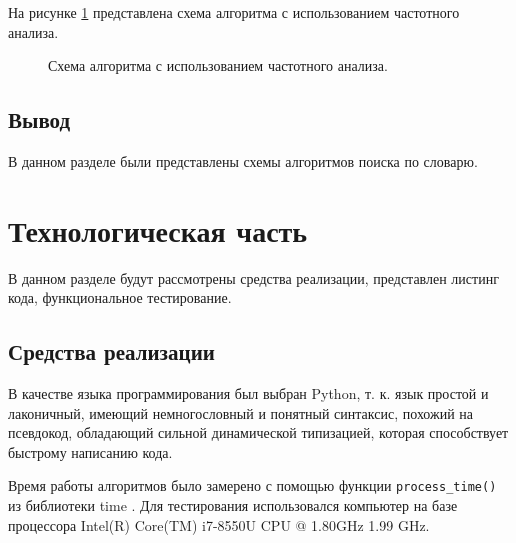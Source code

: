 \documentclass[12pt]{report}
\begin{document}
\newpage
На рисунке \ref{fig:Combi} представлена схема алгоритма с использованием частотного анализа.

\begin{figure}[H]
	\caption{Схема алгоритма с использованием частотного анализа.}
	\label{fig:Combi}
\end{figure}

\section{Вывод}
В данном разделе были представлены схемы алгоритмов поиска по словарю.

\chapter{Технологическая часть}
В данном разделе будут рассмотрены средства реализации, представлен листинг кода, функциональное тестирование.

\section{Средства реализации}
В качестве языка программирования был выбран Python, т. к. язык простой и лаконичный, имеющий немногословный и понятный синтаксис, похожий на псевдокод, обладающий сильной динамической типизацией, которая способствует быстрому написанию кода.
 
Время  работы алгоритмов было замерено с помощью функции \texttt{process\_time()} из библиотеки time \cite{time}. Для тестирования использовался компьютер на базе процессора Intel(R) Core(TM) i7-8550U CPU @ 1.80GHz 1.99 GHz. 
\end{document}
